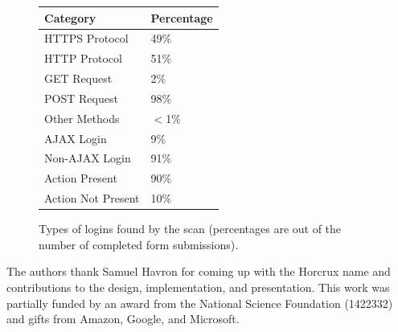 \documentclass[sigconf]{acmart}
\begin{document}
\begin{figure}[h]
\begin{center}
\begin{tabular}{ |p{5cm}|p{2cm}|  }

 \hline
Category &Percentage\\
 \hline
 HTTPS Protocol & 49\% \\
 HTTP Protocol & 51\% \\
 GET Request & 2\% \\
 POST Request & 98\%\\
 Other Methods & $<$1\% \\
 AJAX Login & 9\% \\
 Non-AJAX Login & 91\% \\
 Action Present & 90\% \\
 Action Not Present & 10\% \\


 \hline
\end{tabular}

\end{center}
\caption{Types of logins found by the scan (percentages are out of the number of completed form submissions).}
\label{scan_results_table}
\end{figure}


\begin{acks}
The authors thank Samuel Havron for coming up with the Horcrux name and contributions to the design, implementation, and presentation. This work was partially funded by an award from the National Science Foundation (1422332) and gifts from Amazon, Google, and Microsoft.
\end{acks}


\makeatletter
\def\url@leostyle{%
  \@ifundefined{selectfont}{\def\UrlFont{\sf}}{\def\UrlFont{\scriptsize\sffamily}}}
\makeatother


 
\end{document}
